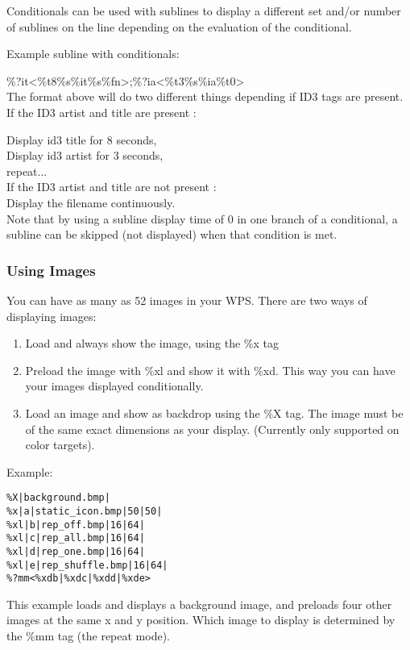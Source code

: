Conditionals can be used with sublines to display a different set and/or number of sublines on the line depending on the evaluation of the conditional.

Example subline with conditionals:

\%?it{\textless}\%t8\%s\%it{\textbar}\%s\%fn{\textgreater};\%?ia{\textless}\%t3\%s\%ia{\textbar}\%t0{\textgreater}\\

The format above will do two different things depending if ID3 tags are present. If the ID3 artist and title are present :

Display id3 title for 8 seconds,\\

Display id3 artist for 3 seconds,\\

repeat...\\

If the ID3 artist and title are not present :\\

Display the filename continuously.\\

Note that by using a subline display time of 0 in one branch of a conditional, a subline can be skipped (not displayed) when that condition is met. 


\subsubsection{Using Images}
You can have as many as 52 images in your WPS. There are two ways of displaying images:
\begin{enumerate}
  \item Load and always show the image, using the \%x tag
  \item Preload the image with \%xl and show it with \%xd. This way you can have your images displayed conditionally.
  \item Load an image and show as backdrop using the \%X tag. The image must be of the same exact dimensions as your display. (Currently only supported on color targets).
\end{enumerate}
Example:
\begin{verbatim}
%X|background.bmp|
%x|a|static_icon.bmp|50|50|
%xl|b|rep_off.bmp|16|64|
%xl|c|rep_all.bmp|16|64|
%xl|d|rep_one.bmp|16|64|
%xl|e|rep_shuffle.bmp|16|64|
%?mm<%xdb|%xdc|%xdd|%xde>
\end{verbatim}
This example loads and displays a background image, and preloads four other images at the same x and y position. Which image to display is determined by the \%mm tag (the repeat mode).

